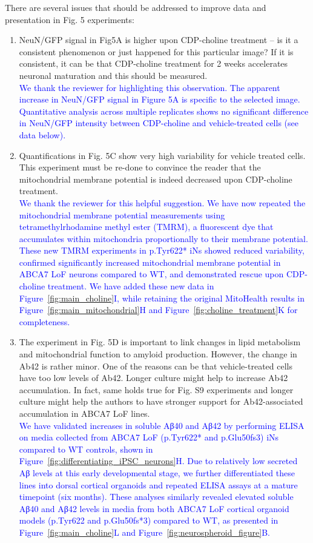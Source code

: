 There are several issues that should be addressed to improve data and presentation in Fig. 5 experiments:
\begin{enumerate}
	\item NeuN/GFP signal in Fig5A is higher upon CDP-choline treatment – is it a consistent phenomenon or just happened for this particular image? If it is consistent, it can be that CDP-choline treatment for 2 weeks accelerates neuronal maturation and this should be measured.\\
	\textcolor{blue}{We thank the reviewer for highlighting this observation. The apparent increase in NeuN/GFP signal in Figure 5A is specific to the selected image. Quantitative analysis across multiple replicates shows no significant difference in NeuN/GFP intensity between CDP-choline and vehicle-treated cells (see data below).}

	\item Quantifications in Fig. 5C show very high variability for vehicle treated cells. This experiment must be re-done to convince the reader that the mitochondrial membrane potential is indeed decreased upon CDP-choline treatment.\\
	\textcolor{blue}{We thank the reviewer for this helpful suggestion. We have now repeated the mitochondrial membrane potential measurements using tetramethylrhodamine methyl ester (TMRM), a fluorescent dye that accumulates within mitochondria proportionally to their membrane potential. These new TMRM experiments in p.Tyr622* iNs showed reduced variability, confirmed significantly increased mitochondrial membrane potential in ABCA7 LoF neurons compared to WT, and demonstrated rescue upon CDP-choline treatment. We have added these new data in Figure~\ref{fig:main_choline}I, while retaining the original MitoHealth results in Figure~\ref{fig:main_mitochondrial}H and Figure~\ref{fig:choline_treatment}K for completeness.}

	\item The experiment in Fig. 5D is important to link changes in lipid metabolism and mitochondrial function to amyloid production. However, the change in Ab42 is rather minor. One of the reasons can be that vehicle-treated cells have too low levels of Ab42. Longer culture might help to increase Ab42 accumulation. In fact, same holds true for Fig. S9 experiments and longer culture might help the authors to have stronger support for Ab42-associated accumulation in ABCA7 LoF lines.\\
	\textcolor{blue}{We have validated increases in soluble Aβ40 and Aβ42 by performing ELISA on media collected from ABCA7 LoF (p.Tyr622* and p.Glu50fs3) iNs compared to WT controls, shown in Figure~\ref{fig:differentiating_iPSC_neurons}H. Due to relatively low secreted Aβ levels at this early developmental stage, we further differentiated these lines into dorsal cortical organoids and repeated ELISA assays at a mature timepoint (six months). These analyses similarly revealed elevated soluble Aβ40 and Aβ42 levels in media from both ABCA7 LoF cortical organoid models (p.Tyr622 and p.Glu50fs*3) compared to WT, as presented in Figure~\ref{fig:main_choline}L and Figure~\ref{fig:neurospheroid_figure}B.}


\end{enumerate}
